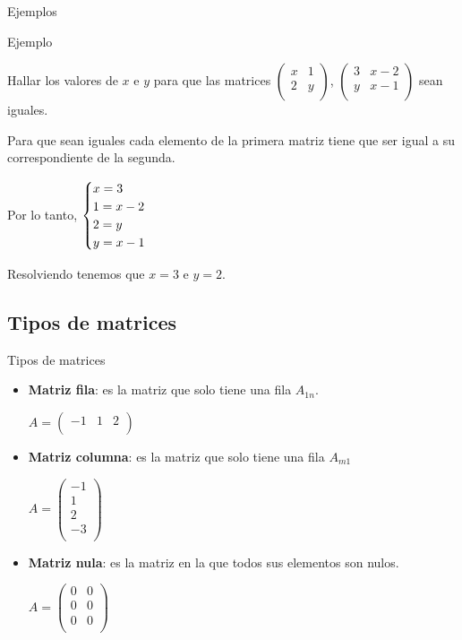 \documentclass[9pt]{beamer}
\begin{document}
\begin{frame}{Ejemplos}
\begin{exampleblock}{Ejemplo}

Hallar los valores de $x$ e $y$ para que las matrices $ \begin{pmatrix}  x & 1 \\  2 & y \\ \end{pmatrix}$, $ \begin{pmatrix}  3 & x-2 \\  y & x-1 \\ \end{pmatrix}$ sean iguales.


\end{exampleblock}

 \pause
 Para que sean iguales cada elemento de la primera matriz tiene que ser igual a su correspondiente de la segunda.
\pause 
 
 Por lo tanto, $\begin{cases} x= 3 \cr 1= x-2 \cr 2= y \cr y=x-1 \end{cases}$
 
 \pause
 Resolviendo tenemos que $x=3 $ e $ y=2$.

\end{frame}

 \subsection{Tipos de matrices}
\begin{frame}{Tipos de matrices}

\begin{itemize}[<+-| alert@+>]
	\item  {\bf Matriz fila}: es la matriz que solo tiene una fila $A_{1n}$.
 
  		$A= \begin{pmatrix}  -1 & 1  & 2  \\ \end{pmatrix}$
  
    \item  {\bf Matriz columna}: es la matriz que solo tiene una fila $A_{m1}$
   
  		$A= \begin{pmatrix}  -1 \\  1  \\  2  \\  -3   \\\end{pmatrix}$

  
   \item  {\bf Matriz nula}: es la matriz en la que todos sus elementos son nulos.
 
  $A= \begin{pmatrix}  0 & 0  \\  0  & 0 \\   0 & 0 \\\end{pmatrix}$
\end{itemize}
\end{frame}
\end{document}
